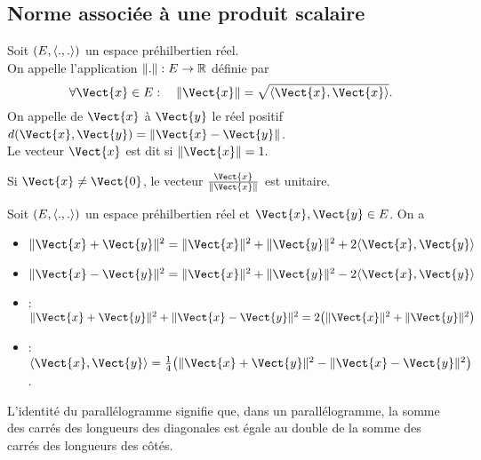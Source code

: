 \documentclass{book}
\begin{document}
\subsection{Norme associée à une produit scalaire}
\begin{Definition}
Soit $(E,\langle.,.\rangle)$ un espace préhilbertien réel.\\
On appelle  l'application $\mathopen\lVert . \mathclose\rVert: E\to \mathbb{R} $ définie par 
$$ \forall \Vect{x}\in E:\quad  \norme{\Vect{x}} =\sqrt{\PS{\Vect{x}}{\Vect{x}}}.$$
On appelle  de $\Vect{x}$ à $\Vect{y}$ le réel positif $d(\Vect{x},\Vect{y}) =\norme{\Vect{x}-\Vect{y}} $.\\ 
Le vecteur $\Vect{x}$ est dit  si $\norme{\Vect{x}}=1.$
\end{Definition}
\begin{Remarque}
Si $\Vect{x}\neq \Vect{0}$, le vecteur $\frac{\Vect{x}}{\norme{\Vect{x}}}$ est unitaire.
\end{Remarque}
\begin{Proposition}
Soit $(E,\langle.,.\rangle)$ un espace préhilbertien réel et $\Vect{x},\Vect{y}\in E$.
On a
\begin{itemize}
\item $\norme{\Vect{x}+\Vect{y}}^2 = \norme{\Vect{x}}^2 + \norme{\Vect{y}}^2 + 2\PS{\Vect{x}}{\Vect{y}}$
\item $\norme{\Vect{x}-\Vect{y}}^2 = \norme{\Vect{x}}^2 + \norme{\Vect{y}}^2 - 2\PS{\Vect{x}}{\Vect{y}}$
\item {}:
  $\norme{\Vect{x}+\Vect{y}}^2 + \norme{\Vect{x}-\Vect{y}}^2 = 2\bigl( \norme{\Vect{x}}^2 + \norme{\Vect{y}}^2 \bigr)$
\item {}:
  $\PS{\Vect{x}}{\Vect{y}} = \frac14 \bigl( \norme{\Vect{x}+\Vect{y}}^2 - \norme{\Vect{x}-\Vect{y}}^2 \bigr)$.
\end{itemize}
L'identité du parallélogramme signifie que, dans un parallélogramme, la somme des carrés des longueurs des diagonales est égale au double de la somme des carrés des longueurs des côtés.
\begin{center}
\end{center}
\end{Proposition}
\end{document}

